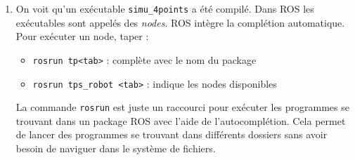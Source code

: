 \documentclass[12pt,a4paper]{article}
\begin{document}
\begin{enumerate}

\item On voit qu'un exécutable \texttt{simu\_4points} a été compilé. Dans ROS les exécutables sont appelés des \emph{nodes}.
ROS intègre la complétion automatique. Pour exécuter un node, taper :
\begin{itemize}
\item \texttt{rosrun tp<tab>} : complète avec le nom du package
\item \texttt{rosrun tps\_robot <tab>} : indique les nodes disponibles
\end{itemize}
La commande \texttt{rosrun} est juste un raccourci pour exécuter les programmes se trouvant dans un package ROS avec l'aide de l'autocomplétion. Cela permet de lancer des programmes se trouvant dans différents dossiers sans avoir besoin de naviguer dans le système de fichiers.


\end{enumerate}
\end{document}
